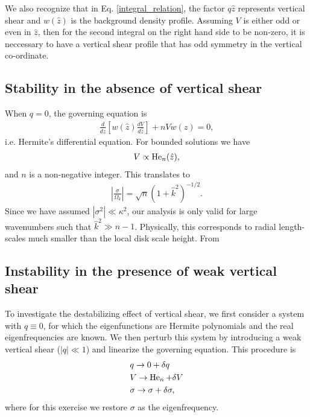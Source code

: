 We also recognize that in Eq. \ref{integral_relation}, 
the factor $q\hat{z}$ represents vertical shear and $w(\hat{z})$ is
the background density profile. Assuming $V$ is either odd or even in
$\hat{z}$,  then for the second integral on the right
hand side to be non-zero, it is neccessary to have a vertical shear
profile that has odd symmetry in the vertical co-ordinate.  

\subsection{Stability in the absence of vertical shear}
When $q=0$, the governing equation is
\begin{align}
  \frac{d}{d\hat{z}}\left[w(\hat{z})\frac{dV}{d\hat{z}}\right] + nV
  w(\hat{z}) =0, 
\end{align}
i.e. Hermite's differential equation. For bounded solutions we have 
\begin{align}
  V\propto \operatorname{He}_n(\hat{z}),
\end{align}
and $n$ is a non-negative integer. This translates to
\begin{align}
  \left|\frac{\sigma}{\Omega_k}\right| = \sqrt{n}
  \left(1+\hat{k}^2\right)^{-1/2}. 
\end{align}
Since we have assumed $|\sigma^2|\ll \kappa^2$, our analysis is only
valid for large wavenumbers such that $\hat{k}^2\gg 
n-1$. Physically, this corresponds to radial length-scales much
smaller than the local disk scale height. From   

\subsection{Instability in the presence of weak vertical shear}
To investigate the destabilizing effect of vertical shear, we first
consider a system with $q\equiv0$, for which the eigenfunctions are
Hermite polynomials and the real eigenfrequencies are known. We then
perturb this system by introducing a weak vertical shear ($|q|\ll1$)
and linearize the governing equation. This procedure is
\begin{align}   
  &q \to 0 + \delta q\\
  &V \to \operatorname{He}_n + \delta V \\
  &\sigma \to \sigma + \delta\sigma, 
\end{align}
where for this exercise we restore $\sigma$ as the eigenfrequency. 

